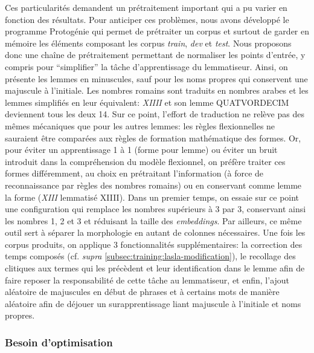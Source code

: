 Ces particularités demandent un prétraitement important qui a pu varier en fonction des résultats. Pour anticiper ces problèmes, nous avons développé le programme Protogénie qui permet de prétraiter un corpus et surtout de garder en mémoire les éléments composant les corpus \textit{train}, \textit{dev} et \textit{test}. Nous proposons donc une chaîne de prétraitement permettant de normaliser les points d'entrée, y compris pour \enquote{simplifier} la tâche d'apprentissage du lemmatiseur. Ainsi, on présente les lemmes en minuscules, sauf pour les noms propres qui conservent une majuscule à l'initiale. Les nombres romains sont traduits en nombres arabes et les lemmes simplifiés en leur équivalent: \textit{XIIII} et son lemme \textsc{QUATVORDECIM} deviennent tous les deux 14. Sur ce point, l'effort de traduction ne relève pas des mêmes mécaniques que pour les autres lemmes: les règles flexionnelles ne sauraient être comparées aux règles de formation mathématique des formes. Or, pour éviter un apprentissage 1 à 1 (forme pour lemme) ou éviter un bruit introduit dans la compréhension du modèle flexionnel, on préfère traiter ces formes différemment, au choix en prétraitant l'information (à force de reconnaissance par règles des nombres romains) ou en conservant comme lemme la forme (\textit{XIII} lemmatisé \textsc{XIIII}). Dans un premier temps, on essaie sur ce point une configuration qui remplace les nombres supérieurs à 3 par 3, conservant ainsi les nombres 1, 2 et 3 et réduisant la taille des \textit{embeddings}. Par ailleurs, ce même outil sert à séparer la morphologie en autant de colonnes nécessaires. Une fois les corpus produits, on applique 3 fonctionnalités supplémentaires: la correction des temps composés (cf. \textit{supra} \ref{subsec:training:lasla-modification}), le recollage des clitiques aux termes qui les précèdent et leur identification dans le lemme afin de faire reposer la responsabilité de cette tâche au lemmatiseur, et enfin, l'ajout aléatoire de majuscules en début de phrases et à certains mots de manière aléatoire afin de déjouer un surapprentissage liant majuscule à l'initiale et noms propres.

\subsubsection{Besoin d'optimisation}

